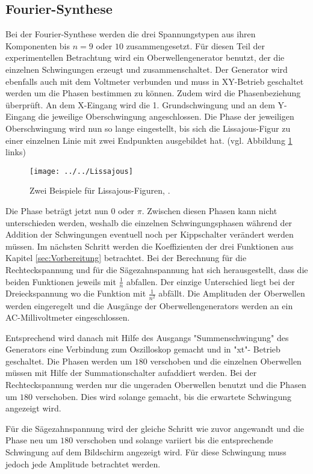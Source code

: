 \subsection{Fourier-Synthese}
Bei der Fourier-Synthese werden die drei Spannungstypen aus ihren Komponenten bis $n = 9$ oder $10$ zusammengesetzt. Für diesen Teil der experimentellen Betrachtung wird ein Oberwellengenerator benutzt, der die einzelnen Schwingungen erzeugt und zusammenschaltet. Der Generator wird ebenfalls auch mit dem Voltmeter verbunden und muss in XY-Betrieb geschaltet werden um die Phasen bestimmen zu können. Zudem wird die Phasenbeziehung überprüft. An dem X-Eingang wird die 1. Grundschwingung und an dem Y-Eingang die jeweilige Oberschwingung angeschlossen. Die Phase der jeweiligen Oberschwingung wird nun so lange eingestellt, bis sich die Lissajous-Figur zu einer einzelnen Linie mit zwei Endpunkten ausgebildet hat. (vgl. Abbildung \ref{fig:lissajous} links)
\begin{figure}
	\centering
	\texttt{[image: ../../Lissajous]}
	\caption{Zwei Beispiele für Lissajous-Figuren, \cite[7]{anleitung351}.}
	\label{fig:lissajous}
\end{figure}
Die Phase beträgt jetzt nun $0$ oder $\pi$. Zwischen diesen Phasen kann nicht unterschieden werden, weshalb die einzelnen Schwingungsphasen während  der Addition der Schwingungen eventuell noch per Kippschalter verändert werden müssen. 
Im nächsten Schritt werden die Koeffizienten der drei Funktionen aus Kapitel \ref{sec:Vorbereitung} betrachtet.
Bei der Berechnung für die Rechteckspannung und für die Sägezahnspannung hat sich herausgestellt, dass die beiden Funktionen jeweils mit $\frac{1}{n}$ abfallen. Der einzige Unterschied liegt bei der Dreieckspannung wo die Funktion mit $\frac{1}{n^{2}}$ abfällt.
Die Amplituden der Oberwellen werden eingeregelt und die Ausgänge der Oberwellengenerators werden an ein AC-Millivoltmeter eingeschlossen. 

Entsprechend wird danach mit Hilfe des Ausgangs "Summenschwingung" des Generators eine Verbindung zum Oszilloskop gemacht und in "xt"- Betrieb geschaltet.
Die Phasen werden um $180$ verschoben und die einzelnen Oberwellen müssen mit Hilfe der Summationschalter aufaddiert werden.  
Bei der Rechteckspannung werden nur die ungeraden Oberwellen benutzt und die Phasen um $180$ verschoben.
Dies wird solange gemacht, bis die erwartete Schwingung angezeigt wird. 

Für die Sägezahnspannung wird der gleiche Schritt wie zuvor angewandt und die Phase neu um $180$ verschoben und solange variiert bis die entsprechende Schwingung auf dem Bildschirm angezeigt wird. Für diese Schwingung muss jedoch jede Amplitude betrachtet werden.

